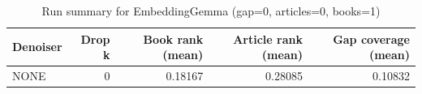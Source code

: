 \begin{table}
\caption{Run summary for EmbeddingGemma (gap=0, articles=0, books=1)}
\label{tab:summary_gap0_embeddinggemma_a0_b1}
\begin{tabular}{lrrrr}
\toprule
Denoiser & Drop k & Book rank (mean) & Article rank (mean) & Gap coverage (mean) \\
\midrule
NONE & 0 & 0.18167 & 0.28085 & 0.10832 \\
\bottomrule
\end{tabular}
\end{table}